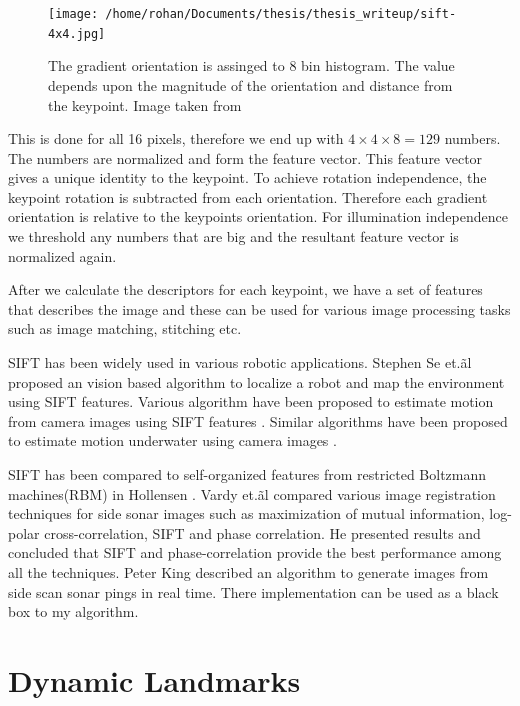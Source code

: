 \documentclass[12pt]{dalcsthesis}
\begin{document}
\begin{figure}
  \centering
     {\texttt{[image: /home/rohan/Documents/thesis/thesis\_writeup/sift-4x4.jpg]}}
  \caption{\label{fig- sift bin histogram gradient} The gradient orientation is assinged to 8 bin histogram. The value depends upon the magnitude of the orientation and distance from the keypoint. Image taken from \cite{sift_url}}
\end{figure}

This is done for all 16 pixels, therefore we end up with $4 \times 4 \times 8=129$ numbers. The numbers are normalized and form the feature vector. This feature vector gives a unique identity to the keypoint. To achieve rotation independence, the keypoint rotation is subtracted from each orientation. Therefore each gradient orientation is relative to the keypoints orientation. For illumination independence we threshold any numbers that are big and the resultant feature vector is normalized again. 

After we calculate the descriptors for each keypoint, we have a set of features that describes the image and these can be used for various image processing tasks such as image matching, stitching etc. 

SIFT has  been widely used in various robotic applications. Stephen Se et.\~al \cite{se2001vision} proposed an vision based algorithm to localize a robot and map the environment using SIFT features. Various algorithm have been proposed to estimate motion from camera images using SIFT features \cite{barfoot2005online} \cite{scaramuzza2008appearance}. Similar algorithms have been proposed to estimate motion underwater using camera images \cite{Silva}.

SIFT has been compared to self-organized features from restricted Boltzmann machines(RBM) in Hollensen \cite{hollesen2011comparison}. Vardy et.\~al \cite{vandrish2011side} compared various image registration techniques for side sonar images such as  maximization of mutual information, log-polar cross-correlation, SIFT and phase correlation. He presented results and concluded that SIFT and phase-correlation provide the best performance among all the techniques. Peter King \cite{king2012real} described an algorithm to generate images from side scan sonar pings in real time. There implementation can be used as a black box to my algorithm.


\section{Dynamic Landmarks}
\label{ch-: dynamic landmarks}
\end{document}
